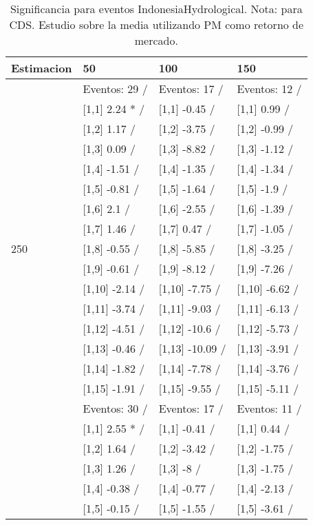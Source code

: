 \begin{table}

\caption{Significancia para eventos IndonesiaHydrological. Nota: para CDS. Estudio sobre la media utilizando PM como retorno de mercado.}
\centering
\begin{tabular}[t]{llll}
\toprule
Estimacion & 50 & 100 & 150\\
\midrule
 & Eventos:  29 / & Eventos:  17 / & Eventos:  12 /\\
 & {}[1,1] 2.24 * / & {}[1,1] -0.45  / & {}[1,1] 0.99  /\\
 & {}[1,2] 1.17  / & {}[1,2] -3.75  / & {}[1,2] -0.99  /\\
 & {}[1,3] 0.09  / & {}[1,3] -8.82  / & {}[1,3] -1.12  /\\
 & {}[1,4] -1.51  / & {}[1,4] -1.35  / & {}[1,4] -1.34  /\\
\addlinespace
 & {}[1,5] -0.81  / & {}[1,5] -1.64  / & {}[1,5] -1.9  /\\
 & {}[1,6] 2.1  / & {}[1,6] -2.55  / & {}[1,6] -1.39  /\\
 & {}[1,7] 1.46  / & {}[1,7] 0.47  / & {}[1,7] -1.05  /\\
250 & {}[1,8] -0.55  / & {}[1,8] -5.85  / & {}[1,8] -3.25  /\\
 & {}[1,9] -0.61  / & {}[1,9] -8.12  / & {}[1,9] -7.26  /\\
\addlinespace
 & {}[1,10] -2.14  / & {}[1,10] -7.75  / & {}[1,10] -6.62  /\\
 & {}[1,11] -3.74  / & {}[1,11] -9.03  / & {}[1,11] -6.13  /\\
 & {}[1,12] -4.51  / & {}[1,12] -10.6  / & {}[1,12] -5.73  /\\
 & {}[1,13] -0.46  / & {}[1,13] -10.09  / & {}[1,13] -3.91  /\\
 & {}[1,14] -1.82  / & {}[1,14] -7.78  / & {}[1,14] -3.76  /\\
\addlinespace
 & {}[1,15] -1.91  / & {}[1,15] -9.55  / & {}[1,15] -5.11  /\\
 & Eventos:  30 / & Eventos:  17 / & Eventos:  11 /\\
 & {}[1,1] 2.55 * / & {}[1,1] -0.41  / & {}[1,1] 0.44  /\\
 & {}[1,2] 1.64  / & {}[1,2] -3.42  / & {}[1,2] -1.75  /\\
 & {}[1,3] 1.26  / & {}[1,3] -8  / & {}[1,3] -1.75  /\\
\addlinespace
 & {}[1,4] -0.38  / & {}[1,4] -0.77  / & {}[1,4] -2.13  /\\
 & {}[1,5] -0.15  / & {}[1,5] -1.55  / & {}[1,5] -3.61  /\\

\end{tabular}
\end{table}
